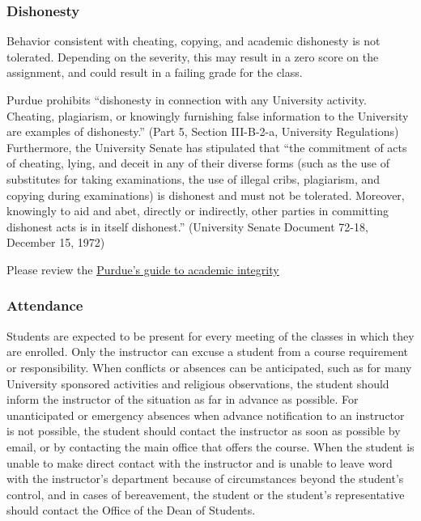 \documentclass{article}
\begin{document}
\hypertarget{dishonesty_22}{}\subsubsection*{{Dishonesty}}\label{dishonesty_22}

Behavior consistent with cheating, copying, and academic dishonesty is not tolerated. Depending on the severity, this may result in a zero score on the assignment, and could result in a failing grade for the class.

Purdue prohibits ``{}dishonesty in connection with any University activity. Cheating, plagiarism, or knowingly furnishing false information to the University are examples of dishonesty.''{} (Part 5, Section III-B-2-a, University Regulations) Furthermore, the University Senate has stipulated that ``{}the commitment of acts of cheating, lying, and deceit in any of their diverse forms (such as the use of substitutes for taking examinations, the use of illegal cribs, plagiarism, and copying during examinations) is dishonest and must not be tolerated. Moreover, knowingly to aid and abet, directly or indirectly, other parties in committing dishonest acts is in itself dishonest.''{} (University Senate Document 72-18, December 15, 1972)

Please review the \href{http://www.purdue.edu/odos/aboutodos/academicintegrity.php}{Purdue'{}s guide to academic integrity}

\hypertarget{attendance_23}{}\subsubsection*{{Attendance}}\label{attendance_23}

Students are expected to be present for every meeting of the classes in which they are enrolled. Only the instructor can excuse a student from a course requirement or responsibility. When conflicts or absences can be anticipated, such as for many University sponsored activities and religious observations, the student should inform the instructor of the situation as far in advance as possible. For unanticipated or emergency absences when advance notification to an instructor is not possible, the student should contact the instructor as soon as possible by email, or by contacting the main office that offers the course. When the student is unable to make direct contact with the instructor and is unable to leave word with the instructor'{}s department because of circumstances beyond the student'{}s control, and in cases of bereavement, the student or the student'{}s representative should contact the Office of the Dean of Students.
\end{document}
